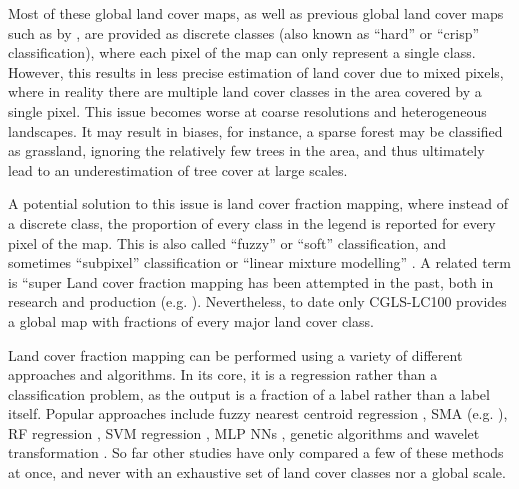 \documentclass[a4paper,10pt]{article}
\begin{document}
Most of these global land cover maps, as well as previous global land cover maps such as by \citet{bartholome2005glc2000, friedl2010modis, arino2007globcover, see2015hybrid, chen2015globeland30}, are provided as discrete classes (also known as ``hard'' or ``crisp'' classification), where each pixel of the map can only represent a single class.
However, this results in less precise estimation of land cover due to mixed pixels, where in reality there are multiple land cover classes in the area covered by a single pixel.
This issue becomes worse at coarse resolutions and heterogeneous landscapes.
It may result in biases, for instance, a sparse forest may be classified as grassland, ignoring the relatively few trees in the area, and thus ultimately lead to an underestimation of tree cover at large scales.

A potential solution to this issue is land cover fraction mapping, where instead of a discrete class, the proportion of every class in the legend is reported for every pixel of the map.
This is also called ``fuzzy'' or ``soft'' classification, and sometimes ``subpixel'' classification or ``linear mixture modelling'' \citep{Okeke2006fuzzyexponent}. A related term is ``super
Land cover fraction mapping has been attempted in the past, both in research \citep{adams_classification_1995, foody1996fuzzyevaluation, colditz_land_2011, sharma_assessing_2011, uma_shankar_wavelet-fuzzy_2011, dwivedi_optimisation_2012, lizarazo_quantitative_2012, gessner_estimating_2013, okujeni_generalizing_2018} and production (e.g. \citealp{hansen2000hardtree, hansen_continuous_2011, pengra_global_2015, hansen_global_2003, sexton_global_2013}).
Nevertheless, to date only \ac{CGLS-LC100} provides a global map with fractions of every major land cover class.

Land cover fraction mapping can be performed using a variety of different approaches and algorithms.
In its core, it is a regression rather than a classification problem, as the output is a fraction of a label rather than a label itself.
Popular approaches include fuzzy nearest centroid regression \citep{zhang2001fullyfuzzy}, \ac{SMA} (e.g. \citealp{yang_landsat_2012, hobbs2003linear, shimabukuro1991least}), \ac{RF} regression \citep{schwieder_estimating_2014}, \gls{SVM} regression \citep{schwieder_estimating_2014}, \gls{MLP} \glspl{NN} \citep{zhang2001fullyfuzzy}, genetic algorithms \citep{stavrakoudis_boosted_2011} and wavelet transformation \citep{uma_shankar_wavelet-fuzzy_2011}.
So far other studies have only compared a few of these methods at once, and never with an exhaustive set of land cover classes nor a global scale.
\end{document}
